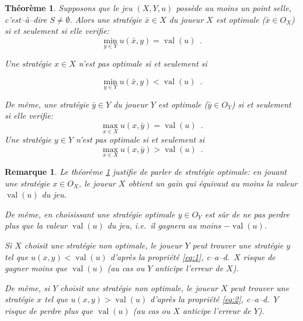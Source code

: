 \documentclass[11pt]{scrartcl}
\theoremstyle{mydefinition}
\newtheorem{rem}[definition]{Remarque}
\theoremstyle{myplain}
\newtheorem{thm}[definition]{Th\'eor\`eme}
\DeclareMathOperator{\val}{val}
\begin{document}
\begin{thm}\label{thm:val_min_max}
 Supposons que le jeu $(X,Y,u)$ poss\`ede au moins un point selle, c'est--\`a--dire $S \neq \emptyset$. Alors une strat\'egie 
 $\bar{x}\in X$ du joueur $X$ est optimale ($\bar{x} \in O_X$) si et seulement si elle verifie:
   \[  \min_{y\in Y} u(\bar{x},y) = \val(u) \enspace . \]

 Une strat\'egie $x\in X$ n'est pas optimale si et seulement si

   \begin{equation}  \min_{y\in Y} u(\bar{x},y) < \val(u) \enspace . \label{eq:1}\end{equation}
 
 De m\^eme, une strat\'egie 
 $\bar{y}\in Y$ du joueur $Y$ est optimale ($\bar{y} \in O_Y$) si et seulement si elle verifie:
   \[  \max_{x\in X} u(x,\bar{y}) = \val(u) \enspace . \]
Une strat\'egie $y\in Y$ n'est pas optimale si et seulement si
\begin{equation}  \max_{x\in X} u(x,\bar{y}) > \val(u) \enspace . \label{eq:2} \end{equation}
   
\end{thm}

\begin{rem}
 Le th\'eor\`eme \ref{thm:val_min_max} justifie de parler de strat\'egie \emph{optimale}: en jouant une strat\'egie $x\in O_X$, 
 le joueur $X$ obtient un gain qui \'equivaut \emph{au moins} la valeur $\val(u)$ du jeu.

 De m\^eme, en choisissant une strat\'egie optimale $y \in O_Y$ est s\^ur de ne pas perdre plus que la valeur $\val(u)$ du jeu, i.e.\
 il gagnera au moins $-\val(u)$.

 Si $X$ choisit une strat\'egie non optimale, le joueur $Y$ peut trouver une strat\'egie $y$ 
 tel que $u(x,y) < \val(u)$ d'apr\`es la propri\'et\'e \eqref{eq:1}, c--a--d.\ $X$ risque de gagner moins que $\val(u)$ 
  (au cas ou $Y$ anticipe l'erreur de $X$).

 De m\^eme, si $Y$ choisit une strat\'egie non optimale, le joueur $X$ peut trouver une strat\'egie $x$ tel que 
  $u(x,y) > \val(u)$ d'apr\`es la propri\'et\'e \eqref{eq:2}, c--a--d.\ $Y$ risque de perdre plus que $\val(u)$ 
  (au cas ou $X$ anticipe l'erreur de $Y$).


\end{rem}
% 
\end{document}
